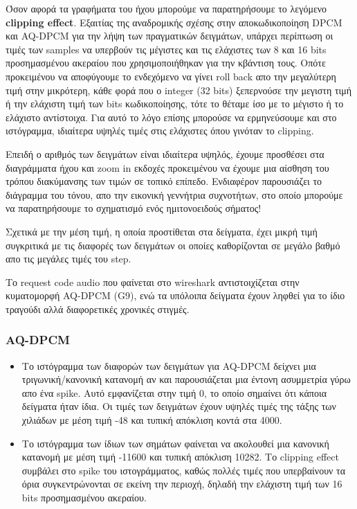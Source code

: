 \documentclass[hidelinks, 12pt, a4paper]{article}
\begin{document}
Όσον αφορά τα γραφήματα του ήχου μπορούμε να παρατηρήσουμε το λεγόμενο \textbf{clipping effect}. Εξαιτίας της αναδρομικής σχέσης στην αποκωδικοποίηση DPCM και AQ-DPCM για την λήψη των πραγματικών δειγμάτων, υπάρχει περίπτωση οι τιμές των samples να υπερβούν τις μέγιστες και τις ελάχιστες των 8 και 16 bits προσημασμένου ακεραίου που χρησιμοποιήθηκαν για την κβάντιση τους. Οπότε προκειμένου να αποφύγουμε το ενδεχόμενο να γίνει roll back απο την μεγαλύτερη τιμή στην μικρότερη, κάθε φορά που ο integer (32 bits) ξεπερνούσε την μεγιστη τιμή ή την ελάχιστη τιμή των bits κωδικοποίησης, τότε το θέταμε ίσο με το μέγιστο ή το ελάχιστο αντίστοιχα. Για αυτό το λόγο επίσης μπορούσε να ερμηνεύσουμε και στο ιστόγραμμα, ιδιαίτερα υψηλές τιμές στις ελάχιστες όπου γινόταν το clipping.

Επειδή ο αριθμός των δειγμάτων είναι ιδιαίτερα υψηλός, έχουμε προσθέσει στα διαγράμματα ήχου και zoom in εκδοχές προκειμένου να έχουμε μια αίσθηση του τρόπου διακύμανσης των τιμών σε τοπικό επίπεδο. Ενδιαφέρον παρουσιάζει το διάγραμμα του τόνου, απο την εικονική γεννήτρια συχνοτήτων, στο οποίο μπορούμε να παρατηρήσουμε το σχηματισμό ενός ημιτονοειδούς σήματος!

Σχετικά με την μέση τιμή, η οποία προστίθεται στα δείγματα, έχει μικρή τιμή συγκριτικά με τις διαφορές των δειγμάτων οι οποίες καθορίζονται σε μεγάλο βαθμό απο τις μεγάλες τιμές του step.

Το request code audio που φαίνεται στο wireshark αντιστοιχίζεται στην κυματομορφή AQ-DPCM (G9), ενώ τα υπόλοιπα δείγματα έχουν ληφθεί για το ίδιο τραγούδι αλλά διαφορετικές χρονικές στιγμές.

\subsubsection{AQ-DPCM}

\begin{itemize}
    \item Το ιστόγραμμα των διαφορών των δειγμάτων για AQ-DPCM δείχνει μια τριγωνική/κανονική κατανομή αν και παρουσιάζεται μια έντονη ασυμμετρία γύρω απο ένα spike. Αυτό εμφανίζεται στην τιμή 0, το οποίο σημαίνει ότι κάποια δείγματα ήταν ίδια. Οι τιμές των δειγμάτων έχουν υψηλές τιμές της τάξης των χιλιάδων με μέση τιμή -48 και τυπική απόκλιση κοντά στα 4000.
    \item Το ιστόγραμμα των ίδιων των σημάτων φαίνεται να ακολουθεί μια κανονική κατανομή με μέση τιμή -11600 και τυπική απόκλιση 10282. Το clipping effect συμβάλει στο spike του ιστογράμματος, καθώς πολλές τιμές που υπερβαίνουν τα όρια συγκεντρώνονται σε εκείνη την περιοχή, δηλαδή την ελάχιστη τιμή των 16 bits προσημασμένου ακεραίου.
\end{itemize}
\end{document}
